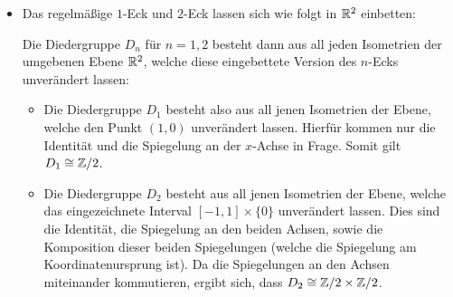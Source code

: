 \begin{itemize}
    \begin{itemize}[resume]
      \item
        Das regelmäßige $1$-Eck und $2$-Eck lassen sich wie folgt in $\mathbb{R}^2$ einbetten:
        \begin{center}
          \hspace{2em}
        \end{center}
      Die Diedergruppe $D_n$ für $n = 1, 2$ besteht dann aus all jeden Isometrien der umgebenen Ebene $\mathbb{R}^2$, welche diese eingebettete Version des $n$-Ecks unverändert lassen:
      \begin{itemize}
        \item
          Die Diedergruppe $D_1$ besteht also aus all jenen Isometrien der Ebene, welche den Punkt $(1,0)$ unverändert lassen.
          Hierfür kommen nur die Identität und die Spiegelung an der $x$-Achse in Frage.
          Somit gilt $D_1 \cong \mathbb{Z}/2$.
        \item
          Die Diedergruppe $D_2$ besteht aus all jenen Isometrien der Ebene, welche das eingezeichnete Interval $[-1, 1] \times \{0\}$ unverändert lassen.
          Dies sind die Identität, die Spiegelung an den beiden Achsen, sowie die Komposition dieser beiden Spiegelungen (welche die Spiegelung am Koordinatenursprung ist).
          Da die Spiegelungen an den Achsen miteinander kommutieren, ergibt sich, dass $D_2 \cong \mathbb{Z}/2 \times \mathbb{Z}/2$.
      \end{itemize}
    \end{itemize}
\end{itemize}





